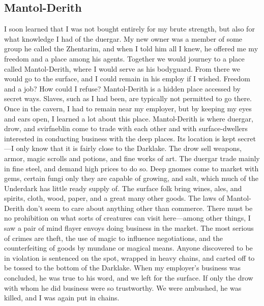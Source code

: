 \documentclass[10pt,a4paper,twoside,twocolumn,openany,bg=print,nodeprecatedcode]{dndbook}
\begin{document}
\subsection{Mantol-Derith}
I soon learned that I was not bought entirely for my brute strength, but also for what knowledge I had of the duergar. My new owner was a member of some group he called the Zhentarim, and when I told him all I knew, he offered me my freedom and a place among his agents. Together we would journey to a place called Mantol-Derith, where I would serve as his bodyguard. From there we would go to the surface, and I could remain in his employ if I wished. Freedom and a job? How could I refuse?
Mantol-Derith is a hidden place accessed by secret ways. Slaves, such as I had been, are typically not permitted to go there. Once in the cavern, I had to remain near my employer, but by keeping my eyes and ears open, I learned a lot about this place.
Mantol-Derith is where duergar, drow, and svirfneblin come to trade with each other and with surface-dwellers interested in conducting business with the deep places. Its location is kept secret—I only know that it is fairly close to the Darklake. The drow sell weapons, armor, magic scrolls and potions, and fine works of art. The duergar trade mainly in fine steel, and demand high prices to do so. Deep gnomes come to market with gems, certain fungi only they are capable of growing, and salt, which much of the Underdark has little ready supply of. The surface folk bring wines, ales, and spirits, cloth, wood, paper, and a great many other goods.
The laws of Mantol-Derith don't seem to care about anything other than commerce. There must be no prohibition on what sorts of creatures can visit here—among other things, I saw a pair of mind flayer envoys doing business in the market. The most serious of crimes are theft, the use of magic to influence negotiations, and the counterfeiting of goods by mundane or magical means. Anyone discovered to be in violation is sentenced on the spot, wrapped in heavy chains, and carted off to be tossed to the bottom of the Darklake.
When my employer's business was concluded, he was true to his word, and we left for the surface. If only the drow with whom he did business were so trustworthy. We were ambushed, he was killed, and I was again put in chains.
\end{document}
